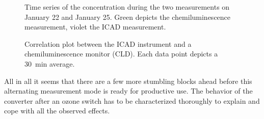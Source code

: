 \begin{figure}[htbp]
  \centering
  
  \hfill
  
  \caption{Time series of the  concentration during the two
    measurements on January 22 and January 25. Green depicts the
    chemiluminescence measurement, violet the ICAD measurement.}
  \label{fig:corr-ts}
\end{figure}
\begin{figure}[htbp]
  \centering
  
  \caption{Correlation plot between the  ICAD instrument and
    a chemiluminescence monitor (CLD). Each data point depicts a
    \SI{30}{\minute} average.}
  \label{fig:cld-corr}
\end{figure}

All in all it seems that there are a few more stumbling blocks ahead
before this alternating measurement mode is ready for productive
use. The behavior of the converter after an ozone switch has to be
characterized thoroughly to explain and cope with all the observed
effects.


